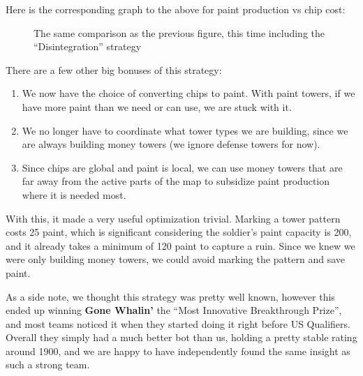 \medskip

Here is the corresponding graph to the above for paint production vs chip cost:

\begin{figure}[H]
  \centering
  \caption{The same comparison as the previous figure, this time including the ``Disintegration'' strategy}
\end{figure}

There are a few other big bonuses of this strategy:
\begin{enumerate}
  \item We now have the choice of converting chips to paint. With paint towers, if we have more paint than we need or can use, we are stuck with it.
  \item We no longer have to coordinate what tower types we are building, since we are always building money towers (we ignore defense towers for now).
  \item Since chips are global and paint is local, we can use money towers that are far away from the active parts of the map to subsidize paint production where it is needed most.
\end{enumerate}
With this, it made a very useful optimization trivial. Marking a tower pattern costs 25 paint, which is significant considering the soldier's paint capacity is 200, and it already takes a minimum of 120 paint to capture a ruin. Since we knew we were only building money towers, we could avoid marking the pattern and save paint.

\medskip

As a side note, we thought this strategy was pretty well known, however this ended up winning \textbf{Gone Whalin'} the ``Most Innovative Breakthrough Prize'', and most teams noticed it when they started doing it right before US Qualifiers. Overall they simply had a much better bot than us, holding a pretty stable rating around 1900, and we are happy to have independently found the same insight as such a strong team.

